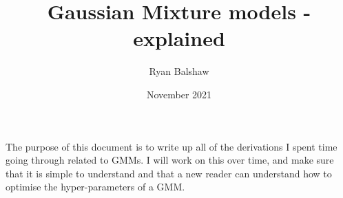 \documentclass{article}
\title{Gaussian Mixture models - explained}
\author{Ryan Balshaw}
\date{November 2021}
\begin{document}
\maketitle

The purpose of this document is to write up all of the derivations I spent time going through related to GMMs. I will work on this over time, and make sure that it is simple to understand and that a new reader can understand how to optimise the hyper-parameters of a GMM.
\end{document}
